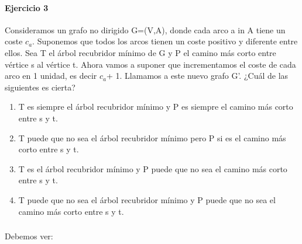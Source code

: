 \documentclass[10pt,a4paper]{article}
\begin{document}
\paragraph{Ejercicio 3}
Consideramos un grafo no dirigido G=(V,A), donde cada arco a in A tiene un coste $c_a$. Suponemos que todos los arcos tienen un coste positivo y diferente entre ellos. Sea T el árbol recubridor mínimo de G y P el camino más corto entre vértice s al vértice t. Ahora vamos a suponer que incrementamos el coste de cada arco en 1 unidad, es decir $c_a$+ 1. Llamamos a este nuevo grafo G’. ¿Cuál de las siguientes es cierta?
\begin{enumerate}
\item T es siempre el árbol recubridor mínimo y P es siempre el camino más corto entre s y t.
\item T puede que no sea el árbol recubridor mínimo pero P si es el camino más corto entre s y t.
\item T es el árbol recubridor mínimo y P puede que no sea el camino más corto entre s y t.
\item T puede que no sea el árbol recubridor mínimo y P puede que no sea el camino más corto entre s y t.
\end{enumerate}
\subparagraph{}
Debemos ver:
\end{document}
